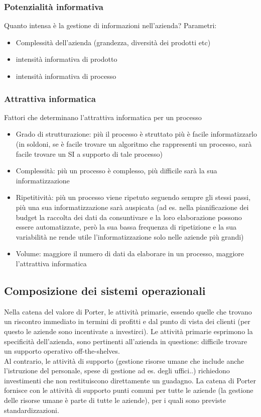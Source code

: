 \subsubsection{Potenzialit\`a informativa}
Quanto intensa \`e la gestione di informazioni nell'azienda?
Parametri:
\begin{itemize}
  \item Complessit\`a dell'azienda (grandezza, diversit\`a dei prodotti etc)
  \item intensit\`a informativa di prodotto
  \item intensit\`a informativa di processo
\end{itemize}
\subsubsection{Attrattiva informatica}
\label{subs:Attrattiva informatica}
Fattori che determinano l'attrattiva informatica per un processo
\begin{itemize}
  \item Grado di strutturazione: pi\`u il processo \`e struttato pi\`u \`e facile
  informatizzarlo (in soldoni, se \`e facile trovare un algoritmo che rappresenti un processo, sar\`a
  facile trovare un SI a supporto di tale processo)
  \item Complessit\`a: pi\`u un processo \`e complesso, pi\`u difficile sar\`a
  la sua informatizzazione
  \item Ripetitivit\`a: pi\`u un processo viene ripetuto seguendo sempre
  gli stessi passi, pi\`u una sua informatizzazione sar\`a auspicata
  (ad es. nella pianificazione dei budget la raccolta dei dati da consuntivare e la loro elaborazione
  possono essere automatizzate, per\`o la sua bassa frequenza di ripetizione e la sua variabilit\`a
  ne rende utile l'informatizzazione solo nelle aziende pi\`u grandi)
  \item Volume: maggiore il numero di dati da elaborare in un processo, maggiore
  l'attrattiva informatica
\end{itemize}

\subsection{Composizione dei sistemi operazionali}
\label{sub:Composizione dei sistemi operazionali}
Nella catena del valore di Porter, le attivit\`a primarie, essendo quelle che
trovano un riscontro immediato in termini di profitti e dal punto di vista dei clienti
(per questo le aziende sono incentivate a investirci).
Le attivit\`a primarie esprimono la specificit\`a dell'azienda, sono
pertinenti all'azienda in questione: difficile trovare un supporto operativo off-the-shelves.\\
Al contrario, le attivit\`a di supporto (gestione risorse umane che include anche l'istruzione
del personale, spese di gestione ad es. degli uffici..) richiedono investimenti che non
restituiscono direttamente un guadagno.
La catena di Porter fornisce con le attivit\`a di supporto punti comuni per tutte le aziende (la gestione
delle risorse umane \`e parte di tutte le aziende), per i quali sono previste
standardizzazioni.
